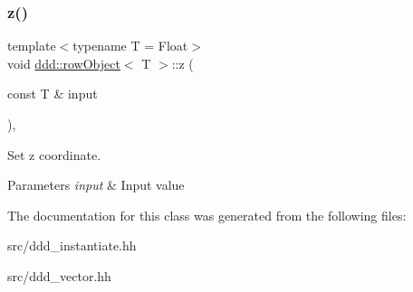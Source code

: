 \subsubsection{\texorpdfstring{z()}{z()}}
{\footnotesize\ttfamily template$<$typename T  = Float$>$ \\
void \hyperlink{classddd_1_1row_object}{ddd\+::row\+Object}$<$ T $>$\+::z (\begin{DoxyParamCaption}\item[{const T \&}]{input }\end{DoxyParamCaption})\hspace{0.3cm}{\ttfamily [inline]}, {\ttfamily [inherited]}}



Set z coordinate. 


\begin{DoxyParams}{Parameters}
{\em input} & Input value \\
\hline
\end{DoxyParams}


The documentation for this class was generated from the following files\+:\begin{DoxyCompactItemize}
\item 
src/ddd\+\_\+instantiate.\+hh\item 
src/ddd\+\_\+vector.\+hh\end{DoxyCompactItemize}
